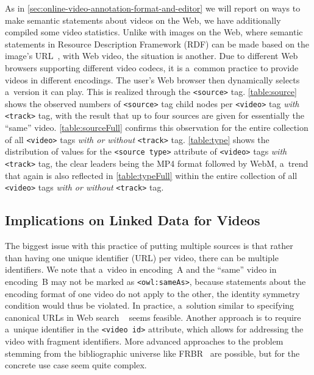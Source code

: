 \documentclass{sig-alternate}
\begin{document}
As in \autoref{sec:online-video-annotation-format-and-editor}
we will report on ways to make semantic statements
about videos on the Web,
we have additionally compiled some video statistics.
Unlike with images on the Web, where
semantic statements in
Resource Description Framework (RDF)
can be made based on the image's
URL~\cite{linsley2009rdfa},
with Web video, the situation is another.
Due to different Web browsers supporting
different video codecs,
it is a~common practice to provide videos
in different encodings.
The user's Web browser then dynamically selects
a~version it can play.
This is realized through the \texttt{<source>} tag.
\autoref{table:source} shows the observed numbers of
\texttt{<source>} tag child nodes per
\texttt{<video>} tag \emph{with} \texttt{<track>} tag,
with the result that up to
four sources are given for essentially the ``same'' video.
\autoref{table:sourceFull} confirms this observation
for the entire collection of all \texttt{<video>} tags
\emph{with or without} \texttt{<track>} tag.
\autoref{table:type} shows the distribution
of values for the \texttt{<source type>} attribute
of \texttt{<video>} tags \emph{with} \texttt{<track>} tag,
the clear leaders being the MP4 format
followed by WebM,
a~trend that again is also reflected
in \autoref{table:typeFull}
within the entire collection
of all \texttt{<video>} tags
\emph{with or without} \texttt{<track>} tag.

\subsection{Implications on Linked Data for Videos}
\label{sec:implications-on-linked-data-for-videos}

The biggest issue with this practice
of putting multiple sources is that
rather than having one unique identifier (URL) per video,
there can be multiple identifiers.
We note that a~video in encoding~A
and the ``same'' video in encoding~B
may not be marked as \texttt{<owl:sameAs>},
because statements about the encoding format
of one video do not apply to the other,
the identity symmetry condition would thus be violated.
In practice, a~solution similar to
specifying canonical URLs in Web search%
~\cite{kupke2009canonical} seems feasible.
Another approach is to require a~unique identifier
in the \texttt{<video id>} attribute,
which allows for addressing the video
with fragment identifiers.
More advanced approaches to the problem
stemming from the bibliographic universe
like FRBR~\cite{tillett2004frbr} are possible,
but for the concrete use case seem quite complex.
\end{document}

